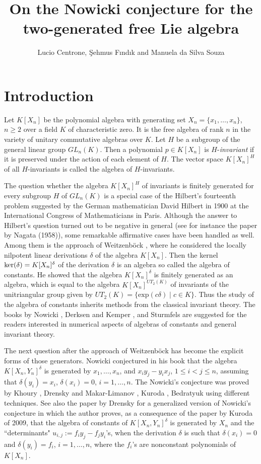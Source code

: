 \documentclass{cimart}
\title{%
    On the Nowicki conjecture for the two-generated free Lie algebra
    }
\author{%
    Lucio Centrone, {\c S}ehmus F{\i}nd{\i}k and Manuela da Silva Souza
    }
\begin{document}
\section{Introduction}

Let $K[X_n]$ be the polynomial algebra with generating set $X_n=\{x_1,\ldots,x_n\}$, $n\geq2$ over a field $K$ of characteristic zero. It is the free algebra of rank
$n$ in the variety of unitary commutative algebras over $K$. Let $H$ be a subgroup of the general linear group
$GL_n(K)$. Then a polynomial $p\in K[X_n]$ is $H$-\textit{invariant} if it is preserved under the action of each element of $H$. The vector space
$K[X_n]^H$ of all $H$-invariants is called the algebra of $H$-invariants.

The question whether the algebra $K[X_n]^H$ of invariants
is finitely generated for every subgroup $H$ of $GL_n(K)$ is a special case of the Hilbert's fourteenth problem
suggested by the German mathematician David Hilbert in 1900 at the International Congress of Mathematicians in Paris.
Although the answer to Hilbert's question turned out to be negative in general (see for instance the paper by Nagata \cite{Ngt} (1958)), some remarkable affirmative cases have been handled as well.
Among them is the approach of Weitzenb\"ock \cite{W}, where he considered the locally nilpotent linear derivations $\delta$ of the algebra $K[X_n]$.
Then the kernel $\text{\rm ker}(\delta)=K[X_n]^{\delta}$ of the derivation $\delta$ is an algebra so called the algebra of constants.
He showed that the algebra $K[X_n]^{\delta}$ is finitely generated as an algebra, which is equal to the algebra 
$K[X_n]^{UT_2(K)}$ of invariants of 
the unitriangular group given by ${UT_2(K)}=\{\text{exp}(c\delta)\mid c\in K\}$.
Thus the study of the algebra of constants inherits methods from the classical invariant theory. 
The books by Nowicki \cite{N}, Derksen and Kemper \cite{DK},
and Sturmfels \cite{St} are suggested for the readers interested in numerical aspects of algebras of constants and general invariant theory.

The next question after the approach of Weitzenb\"ock has become the explicit forms of those generators. Nowicki conjectured in his book \cite{N} that the algebra $K[X_n,Y_n]^{\delta}$
is generated by $x_1,\ldots,x_n$, and $x_iy_j-y_ix_j$, $1\leq i<j\leq n$,
assuming that $\delta(y_{i})=x_{i}$, $\delta(x_{i})=0$, $i=1,\ldots,n$.
The Nowicki's conjecture was proved by Khoury \cite{K1,K2}, 
Drensky and Makar-Limanov \cite{DML}, Kuroda \cite{Kuroda},
Bedratyuk \cite{Bed} using different techniques. See also the paper \cite{D2} by Drensky for a generalized version of Nowicki's conjecture in which the author proves, as a consequence of the paper by Kuroda of 2009, that the algebra of constants of $K[X_n,Y_n]^\delta$ is generated by $X_n$ and the “determinants" $u_{i,j}:=f_iy_j-f_jy_i$'s, when the derivation $\delta$ is such that $\delta(x_i)=0$ and $\delta(y_i)=f_i$, $i=1,\ldots,n$, where the $f_i$'s are nonconstant polynomials of $K[X_n]$.
\end{document}
